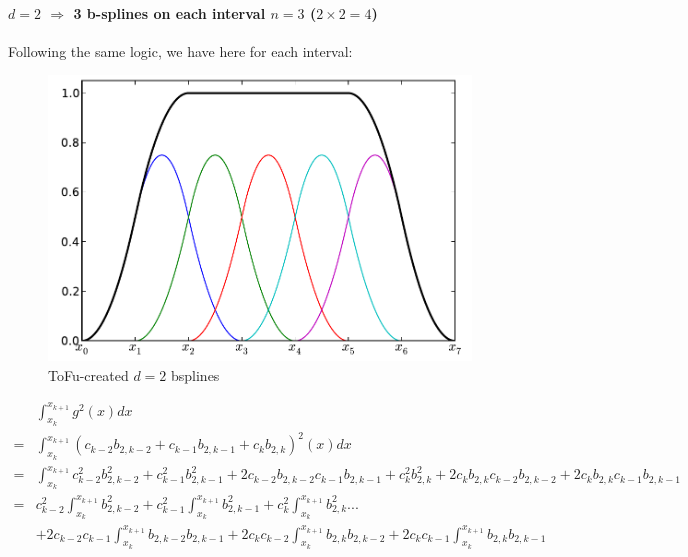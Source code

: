 \documentclass[paper=a4, fontsize=11pt]{book}
\numberwithin{equation}{section}		%
\numberwithin{figure}{section}			%
\numberwithin{table}{section}				%
\begin{document}
\begin{landscape}
\newpage
\paragraph{\textbf{$d=2$ $\Rightarrow$ 3 b-splines on each interval $n=3$ ($2\times2=4$)}}

Following the same logic, we have here for each interval:

\begin{figure}
  \vspace{-20pt}
  \begin{center}
    \includegraphics[scale=0.4]{Fig01_BSplines_Int_D2.pdf}
  \end{center}
  \vspace{-20pt}
  \caption{\footnotesize ToFu-created $d=2$ bsplines}
  \vspace{-10pt}
\end{figure}

$$
\begin{array}{lll}
& \int_{x_k}^{x_{k+1}} g^2(x)dx\\
= & \int_{x_k}^{x_{k+1}} \left( c_{k-2}b_{2,k-2} + c_{k-1}b_{2,k-1} + c_{k}b_{2,k} \right)^2(x)dx \\
= & \int_{x_k}^{x_{k+1}} c_{k-2}^2b_{2,k-2}^2 + c_{k-1}^2b_{2,k-1}^2 + 2c_{k-2}b_{2,k-2}c_{k-1}b_{2,k-1} + c_{k}^2b_{2,k}^2 + 2c_{k}b_{2,k}c_{k-2}b_{2,k-2} + 2c_{k}b_{2,k}c_{k-1}b_{2,k-1} \\
= & c_{k-2}^2\int_{x_k}^{x_{k+1}}b_{2,k-2}^2 + c_{k-1}^2\int_{x_k}^{x_{k+1}}b_{2,k-1}^2 + c_{k}^2\int_{x_k}^{x_{k+1}}b_{2,k}^2 ...\\
  &  + 2c_{k-2}c_{k-1}\int_{x_k}^{x_{k+1}}b_{2,k-2}b_{2,k-1} + 2c_{k}c_{k-2}\int_{x_k}^{x_{k+1}}b_{2,k}b_{2,k-2} + 2c_{k}c_{k-1}\int_{x_k}^{x_{k+1}}b_{2,k}b_{2,k-1}
\end{array}
$$


\end{landscape}
\end{document}
